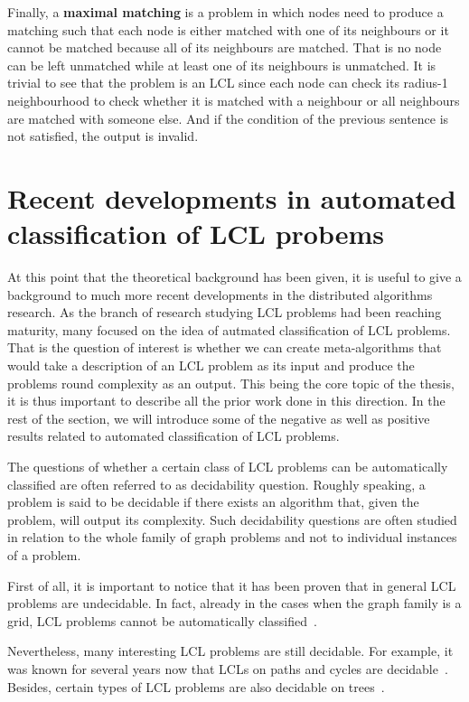 Finally, a \textbf{maximal matching} is a problem in which nodes need to
produce a matching such that each node is either matched with one of 
its neighbours or it cannot be matched because all of its neighbours are
matched. That is no node can be left unmatched while at least one of its
neighbours is unmatched. It is trivial to see that the problem is an LCL
since each node can check its radius-1 neighbourhood to check whether it
is matched with a neighbour or all neighbours are matched with someone else.
And if the condition of the previous sentence is not satisfied, the output
is invalid.

\section{Recent developments in automated classification of LCL probems}

At this point that the theoretical background has been given, it is
useful to give a background to much more recent developments in the
distributed algorithms research. As the branch of research
studying LCL problems had been reaching maturity, many focused
on the idea of autmated classification of LCL problems. That is
the question of interest is whether we can create meta-algorithms
that would take a description of an LCL problem as its input
and produce the problems round complexity as an output.
This being the core topic of the thesis, it is thus important
to describe all the prior work done in this direction.
In the rest of the
section, we will introduce some of the negative as well as positive results
related to automated classification of LCL problems.

The questions of whether a certain class of LCL problems
can be automatically classified are often referred to
as decidability question. Roughly speaking, a problem is
said to be decidable if there exists an algorithm that,
given the problem, will output its complexity. Such decidability
questions are often studied in relation to the whole
family of graph problems and not to individual instances
of a problem.

First of all, it is important to notice that it has been
proven that in general LCL problems are undecidable.
In fact, already in the cases when the graph family is a grid,
LCL problems cannot be automatically classified~\cite{Brandt2017, Naor1993}.

Nevertheless, many interesting LCL problems are still decidable.
For example, it was known for several years now that LCLs
on paths and cycles are decidable~\cite{Balliu2018, Brandt2017, Naor1993}.
Besides, certain types of LCL problems are also decidable on
trees~\cite{Chang2017}.

